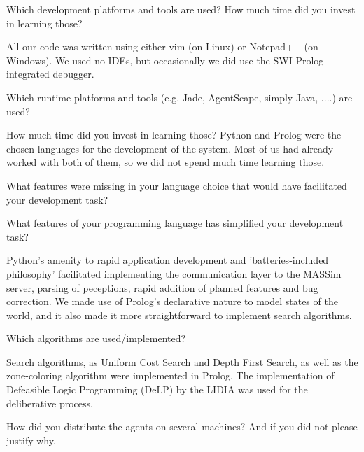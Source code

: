 \begin{question}
Which development platforms and tools are used? How much time did you
invest in learning those?  
\end{question}

All our code was written using either vim (on Linux) or Notepad++ (on Windows). We used no IDEs, but
occasionally we did use the SWI-Prolog integrated debugger.

\begin{question}
Which runtime platforms and tools (e.g. Jade, AgentScape, simply Java,
....) are used? 
\end{question}

How much time did you invest in learning those?  Python and
Prolog were the chosen languages for the development of the system. Most of us
had already worked with both of them, so we did not spend much time learning
those.

\begin{question}
What features were missing in your language choice that would have
facilitated your development task?
\end{question}



\begin{question}
What features of your programming language has simplified your development
task?  
\end{question}

Python's amenity to rapid application development and
'batteries-included philosophy' facilitated implementing the communication
layer to the MASSim server, parsing of peceptions, rapid addition of planned
features and bug correction.  We made use of Prolog's declarative nature to
model states of the world, and it also made it more straightforward to
implement search algorithms.

\begin{question}
Which algorithms are used/implemented?  
\end{question}

Search algorithms, as Uniform Cost
Search and Depth First Search, as well as the zone-coloring algorithm were
implemented in Prolog.  The implementation of Defeasible Logic Programming
(DeLP) by the LIDIA was used for the deliberative process.

\begin{question}
How did you distribute the agents on several machines? And if you did not
please justify why.  
\end{question}

